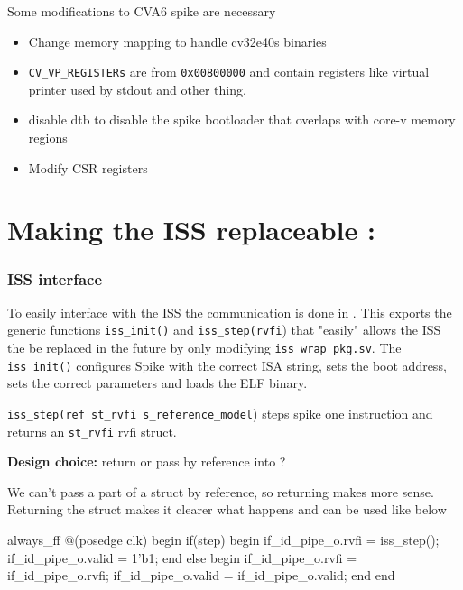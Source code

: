 Some modifications to CVA6 spike are necessary
\begin{itemize}
    \item Change memory mapping to handle cv32e40s binaries 
    \item \lstinline{CV_VP_REGISTERs} are from \lstinline{0x00800000} and contain registers like virtual printer used by stdout and other thing.
    \item  disable dtb to disable the spike bootloader that overlaps with core-v memory regions
    \item Modify CSR registers
\end{itemize}




\section{Making the ISS replaceable :  }

\subsubsection{ISS interface}

To easily interface with the ISS the communication is done in . This exports the generic functions \lstinline{iss_init()} and \lstinline{iss_step(rvfi}) that "easily" allows the ISS the be replaced in the future by only modifying \lstinline{iss_wrap_pkg.sv}. The \lstinline{iss_init()} configures Spike with the correct ISA string, sets the boot address, sets the correct parameters and loads the ELF binary. 

\lstinline{iss_step(ref st_rvfi s_reference_model}) steps spike one instruction and returns an \lstinline{st_rvfi} rvfi struct.

\textbf{Design choice:} return  or pass by reference into ?

We can't pass a part of a struct by reference, so returning makes more sense.
Returning the struct makes it clearer what happens and can be used like below

\begin{systemverilog}
always_ff @(posedge clk) begin
    if(step) begin
        if_id_pipe_o.rvfi = iss_step();
        if_id_pipe_o.valid = 1'b1;
    end
    else begin
        if_id_pipe_o.rvfi = if_id_pipe_o.rvfi;
        if_id_pipe_o.valid = if_id_pipe_o.valid;
    end
end

\end{systemverilog}

